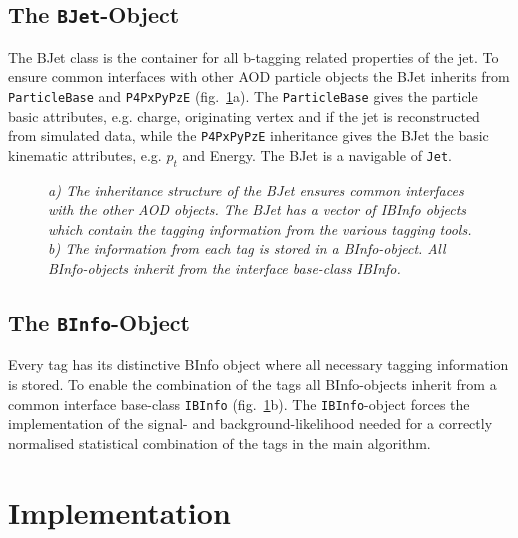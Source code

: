 \documentclass[a4paper,12pt]{article}
\begin{document}
\subsection{The {\tt BJet}-Object}\label{sec:bjet}
The BJet class is the container for all b-tagging related properties 
of the jet. To ensure common interfaces with other AOD particle objects the
BJet inherits from {\tt ParticleBase} and {\tt P4PxPyPzE} 
(fig.~\ref{fig:bjet}a). The {\tt ParticleBase} gives the particle basic 
attributes, e.g. charge, originating vertex and if the jet is reconstructed 
from simulated data, while the {\tt P4PxPyPzE} inheritance gives the BJet 
the basic kinematic attributes, e.g. $p_t$ and Energy. The BJet is a 
navigable of {\tt Jet}.

\begin{figure}[htbp]
  \centerline{
    }
  \caption[]{\label{fig:bjet}\sl
    a) The inheritance structure of the BJet ensures common interfaces with
    the other AOD objects. The BJet has a vector of IBInfo objects which
    contain the tagging information from the various tagging tools. b) The 
    information from each tag is stored in a BInfo-object. All 
    BInfo-objects inherit from the interface base-class IBInfo.}
\end{figure}

\subsection{The {\tt BInfo}-Object}\label{sec:binfo}
Every tag has its distinctive BInfo object where all necessary tagging 
information is stored. To enable the combination of the tags all 
BInfo-objects inherit from a common interface base-class {\tt IBInfo}
(fig.~\ref{fig:bjet}b). The {\tt IBInfo}-object forces the implementation 
of the signal- and background-likelihood needed for a correctly normalised 
statistical combination of the tags in the main algorithm.  




\section{Implementation}\label{implementation}
\end{document}
